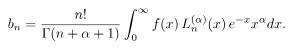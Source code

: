 \[b_{n}=\frac{n!}{\mathop{\Gamma\/}\nolimits(n+\alpha+1)}\int_{0}^{\infty}f(x)%
\mathop{L^{(\alpha)}_{n}\/}\nolimits\!\left(x\right)e^{-x}x^{\alpha}dx.\]